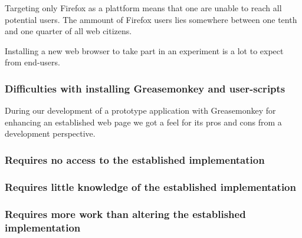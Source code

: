 Targeting only Firefox as a plattform means that one are unable to reach
all potential users. The ammount of Firefox users lies somewhere
between one tenth and one quarter of all web citizens.%

Installing a new web browser to take part in an
experiment is a lot to expect from end-users.





\subsubsection{Difficulties with installing Greasemonkey and user-scripts}


\parabreak

During our development of a prototype application with Greasemonkey for
enhancing an established web page we got a feel for its pros and cons from a
development perspective.

\subsubsection{Requires no access to the established implementation}

\subsubsection{Requires little knowledge of the established implementation}

\subsubsection{Requires more work than altering the established
  implementation}

